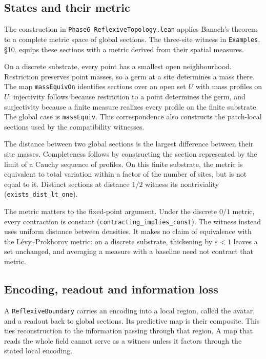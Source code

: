 \documentclass{article}
\begin{document}
\subsection{States and their metric}

The construction in \nolinkurl{Phase6_ReflexiveTopology.lean} applies Banach's theorem to a complete metric space of global sections. The three-site witness in \texttt{Examples}, \S10, equips these sections with a metric derived from their spatial measures.

On a discrete substrate, every point has a smallest open neighbourhood. Restriction preserves point masses, so a germ at a site determines a mass there. The map \texttt{massEquivOn} identifies sections over an open set $U$ with mass profiles on $U$: injectivity follows because restriction to a point determines the germ, and surjectivity because a finite measure realizes every profile on the finite substrate. The global case is \texttt{massEquiv}. This correspondence also constructs the patch-local sections used by the compatibility witnesses.

The distance between two global sections is the largest difference between their site masses. Completeness follows by constructing the section represented by the limit of a Cauchy sequence of profiles. On this finite substrate, the metric is equivalent to total variation within a factor of the number of sites, but is not equal to it. Distinct sections at distance $1/2$ witness its nontriviality (\nolinkurl{exists_dist_lt_one}).

The metric matters to the fixed-point argument. Under the discrete $0/1$ metric, every contraction is constant (\nolinkurl{contracting_implies_const}). The witness instead uses uniform distance between densities. It makes no claim of equivalence with the L\'evy--Prokhorov metric: on a discrete substrate, thickening by $\varepsilon<1$ leaves a set unchanged, and averaging a measure with a baseline need not contract that metric.

\subsection{Encoding, readout and information loss}

A \texttt{ReflexiveBoundary} carries an encoding into a local region, called the avatar, and a readout back to global sections. Its predictive map is their composite. This ties reconstruction to the information passing through that region. A map that reads the whole field cannot serve as a witness unless it factors through the stated local encoding.
\end{document}
